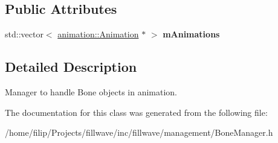 \subsection*{Public Attributes}
\begin{DoxyCompactItemize}
\item 
\hypertarget{classfillwave_1_1manager_1_1BoneManager_ae65b2366dd24b824412abadde8c80571}{}std\+::vector$<$ \hyperlink{classfillwave_1_1animation_1_1Animation}{animation\+::\+Animation} $\ast$ $>$ {\bfseries m\+Animations}\label{classfillwave_1_1manager_1_1BoneManager_ae65b2366dd24b824412abadde8c80571}

\end{DoxyCompactItemize}


\subsection{Detailed Description}
Manager to handle Bone objects in animation. 

The documentation for this class was generated from the following file\+:\begin{DoxyCompactItemize}
\item 
/home/filip/\+Projects/fillwave/inc/fillwave/management/Bone\+Manager.\+h\end{DoxyCompactItemize}
